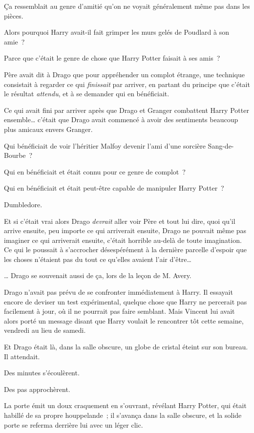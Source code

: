 Ça ressemblait au genre d'amitié qu'on ne voyait généralement même pas dans les pièces.

Alors pourquoi Harry avait-il fait grimper les murs gelés de Poudlard à son amie~?

Parce que c'était le genre de chose que Harry Potter faisait à ses amis~?

Père avait dit à Drago que pour appréhender un complot étrange, une technique consistait à regarder ce qui \emph{finissait} par arriver, en partant du principe que c'était le résultat \emph{attendu}, et à se demander qui en bénéficiait.

Ce qui avait fini par arriver après que Drago et Granger combattent Harry Potter ensemble… c'était que Drago avait commencé à avoir des sentiments beaucoup plus amicaux envers Granger.

Qui bénéficiait de voir l'héritier Malfoy devenir l'ami d'une sorcière Sang-de-Bourbe~?

Qui en bénéficiait et était connu pour ce genre de complot~?

Qui en bénéficiait et était peut-être capable de manipuler Harry Potter~?

Dumbledore.

Et si c'était vrai alors Drago \emph{devrait} aller voir Père et tout lui dire, quoi qu'il arrive ensuite, peu importe ce qui arriverait ensuite, Drago ne pouvait même pas imaginer ce qui arriverait ensuite, c'était horrible au-delà de toute imagination. Ce qui le poussait à s'accrocher désespérément à la dernière parcelle d'espoir que les choses n'étaient pas du tout ce qu'elles avaient l'air d'être…

… Drago se souvenait aussi de ça, lors de la leçon de M. Avery.

Drago n'avait pas prévu de se confronter immédiatement à Harry. Il essayait encore de deviser un test expérimental, quelque chose que Harry ne percerait pas facilement à jour, où il ne pourrait pas faire semblant. Mais Vincent lui avait alors porté un message disant que Harry voulait le rencontrer tôt cette semaine, vendredi au lieu de samedi.

Et Drago était là, dans la salle obscure, un globe de cristal éteint sur son bureau. Il attendait.

Des minutes s'écoulèrent.

Des pas approchèrent.

La porte émit un doux craquement en s'ouvrant, révélant Harry Potter, qui était habillé de sa propre houppelande~; il s'avança dans la salle obscure, et la solide porte se referma derrière lui avec un léger clic.

